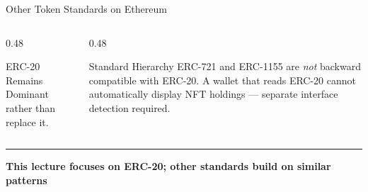 \documentclass[8pt,aspectratio=169]{beamer}
\newcommand{\bottomnote}[1]{\vfill\vspace{-2mm}\textcolor{mllavender2}{\rule{\textwidth}{0.4pt}}\vspace{1mm}\footnotesize\textbf{#1}}
\begin{document}
\begin{frame}{Other Token Standards on Ethereum}
\begin{columns}[T]
\begin{column}{0.48\textwidth}
\begin{block}{ERC-20 Remains Dominant}
        rather than replace it.
      \end{block}
    \end{column}
    \begin{column}{0.48\textwidth}
      \begin{block}{Standard Hierarchy}
        \small
        ERC-721 and ERC-1155 are \emph{not} backward compatible with ERC-20.
        A wallet that reads ERC-20 cannot automatically display NFT holdings ---
        separate interface detection required.
      \end{block}
    \end{column}
  \end{columns}
  \bottomnote{This lecture focuses on ERC-20; other standards build on similar patterns}
\end{frame}
\end{document}
